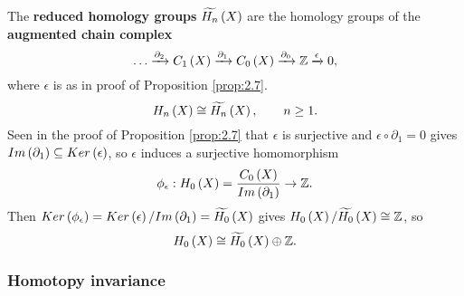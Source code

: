 The \textbf{reduced homology groups} $ \widetilde{H_n}\left( X \right) $ are the homology groups of the \textbf{augmented chain complex}
$$ \dots \xrightarrow{\partial_2} C_1\left( X \right) \xrightarrow{\partial_1} C_0\left( X \right) \xrightarrow{\partial_0} \mathbb{Z} \xrightarrow{\epsilon} 0, $$
where $ \epsilon $ is as in proof of Proposition \ref{prop:2.7}.
$$ H_n\left( X \right) \cong \widetilde{H_n}\left( X \right), \qquad n \ge 1. $$
Seen in the proof of Proposition \ref{prop:2.7} that $ \epsilon $ is surjective and $ \epsilon \circ \partial_1 = 0 $ gives $ Im\left( \partial_1 \right) \subseteq Ker\left( \epsilon \right) $, so $ \epsilon $ induces a surjective homomorphism
$$ \phi_\epsilon : H_0\left( X \right) = \dfrac{C_0\left( X \right)}{Im\left( \partial_1 \right)} \to \mathbb{Z}. $$
Then $ Ker\left( \phi_\epsilon \right) = Ker\left( \epsilon \right) / Im\left( \partial_1 \right) = \widetilde{H_0}\left( X \right) $ gives $ H_0\left( X \right) / \widetilde{H_0}\left( X \right) \cong \mathbb{Z} $, so
$$ H_0\left( X \right) \cong \widetilde{H_0}\left( X \right) \oplus \mathbb{Z}. $$


\subsubsection{Homotopy invariance}


